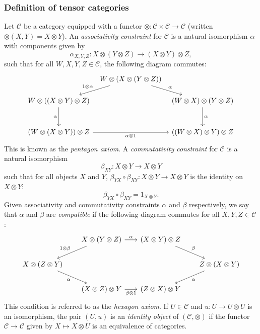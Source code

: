 \documentclass[10pt]{amsart}
\numberwithin{equation}{section}
\def\~#1{\mathscr{#1}}
\theoremstyle{plain}
\theoremstyle{definition}
\theoremstyle{remark}
\begin{document}
\subsubsection{Definition of tensor categories}\label{ssub:2.1.1}
Let $\~C$ be a category equipped with a functor $\otimes: \~C \times \~C \to \~C$ (written $\otimes(X, Y) = X \otimes Y$). An \emph{associativity constraint} for $\~C$ is a natural isomorphism $\alpha$ with components given by
\[\alpha_{X, Y, Z}: X \otimes (Y \otimes Z) \to (X \otimes Y) \otimes Z,\]
such that for all $W, X, Y, Z \in \~C$, the following diagram commutes:
\begin{equation}\label{eq:pentagon}
\begin{tikzcd}[column sep=tiny,row sep=scriptsize]
    & {W \otimes(X \otimes(Y \otimes Z))} \\
    {W \otimes ((X \otimes Y) \otimes Z)} && {(W \otimes X) \otimes (Y \otimes Z)} \\
    \\
    {(W \otimes (X \otimes Y)) \otimes Z} && {((W \otimes X) \otimes Y)\otimes Z}
    \arrow["{1 \otimes \alpha}"', from=1-2, to=2-1]
    \arrow["\alpha", from=1-2, to=2-3]
    \arrow["\alpha"', from=2-1, to=4-1]
    \arrow["\alpha", from=2-3, to=4-3]
    \arrow["{\alpha \otimes 1}"', from=4-1, to=4-3]
\end{tikzcd}
\end{equation}
This is known as the \emph{pentagon axiom}. A \emph{commutativity constraint} for $\~C$ is a natural isomorphism 
\[\beta_{XY}: X \otimes Y \to X \otimes Y\]
such that for all objects $X$ and $Y$, $\beta_{YX} \circ \beta_{XY}: X \otimes Y \to X \otimes Y$ is the identity on $X \otimes Y$:
\[\beta_{YX} \circ \beta_{XY} = 1_{X \otimes Y}.\]
Given associativity and commutativity constraints $\alpha$ and $\beta$ respectively, we say that $\alpha$ and $\beta$ are \emph{compatible} if the following diagram commutes for all $X, Y, Z \in \~C$:
\[\begin{tikzcd}[column sep=scriptsize]
    & {X \otimes(Y \otimes Z)} & {(X \otimes Y) \otimes Z} \\
    {X \otimes(Z \otimes Y)} &&& {Z \otimes (X \otimes Y)} \\
    & {(X \otimes Z) \otimes Y} & {(Z \otimes X) \otimes Y}
    \arrow["\alpha", from=1-2, to=1-3]
    \arrow["{1 \otimes \beta}"', from=1-2, to=2-1]
    \arrow["\beta", from=1-3, to=2-4]
    \arrow["\alpha"', from=2-1, to=3-2]
    \arrow["\alpha", from=2-4, to=3-3]
    \arrow["{\beta \otimes 1}"', from=3-2, to=3-3]
\end{tikzcd}\]
This condition is referred to as the \emph{hexagon axiom}. If $U \in \~C$ and $u: U \to U \otimes U$ is an isomorphism, the pair $(U, u)$ is an \emph{identity object} of $(\~C, \otimes)$ if the functor $\~C \to \~C$ given by $X \mapsto X \otimes U$ is an equivalence of categories.
\end{document}
